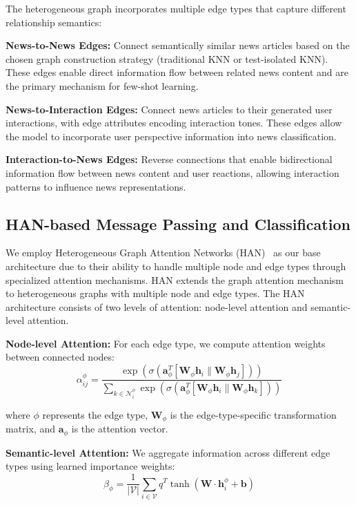 The heterogeneous graph incorporates multiple edge types that capture different relationship semantics:

\textbf{News-to-News Edges:} Connect semantically similar news articles based on the chosen graph construction strategy (traditional KNN or test-isolated KNN). These edges enable direct information flow between related news content and are the primary mechanism for few-shot learning.

\textbf{News-to-Interaction Edges:} Connect news articles to their generated user interactions, with edge attributes encoding interaction tones. These edges allow the model to incorporate user perspective information into news classification.

\textbf{Interaction-to-News Edges:} Reverse connections that enable bidirectional information flow between news content and user reactions, allowing interaction patterns to influence news representations.

\subsection{HAN-based Message Passing and Classification}

We employ Heterogeneous Graph Attention Networks (HAN)~\cite{wang2019han} as our base architecture due to their ability to handle multiple node and edge types through specialized attention mechanisms. HAN extends the graph attention mechanism~\cite{veličković2018graph} to heterogeneous graphs with multiple node and edge types. The HAN architecture consists of two levels of attention: node-level attention and semantic-level attention.

\textbf{Node-level Attention:} For each edge type, we compute attention weights between connected nodes:
\begin{equation}
\alpha_{ij}^{\phi} = \frac{\exp(\sigma(\mathbf{a}_{\phi}^T[\mathbf{W}_{\phi}\mathbf{h}_i \| \mathbf{W}_{\phi}\mathbf{h}_j]))}{\sum_{k \in \mathcal{N}_i^{\phi}} \exp(\sigma(\mathbf{a}_{\phi}^T[\mathbf{W}_{\phi}\mathbf{h}_i \| \mathbf{W}_{\phi}\mathbf{h}_k]))}
\end{equation}

where $\phi$ represents the edge type, $\mathbf{W}_{\phi}$ is the edge-type-specific transformation matrix, and $\mathbf{a}_{\phi}$ is the attention vector.

\textbf{Semantic-level Attention:} We aggregate information across different edge types using learned importance weights:
\begin{equation}
\beta_{\phi} = \frac{1}{|\mathcal{V}|} \sum_{i \in \mathcal{V}} q^T \tanh(\mathbf{W} \cdot \mathbf{h}_i^{\phi} + \mathbf{b})
\end{equation}

